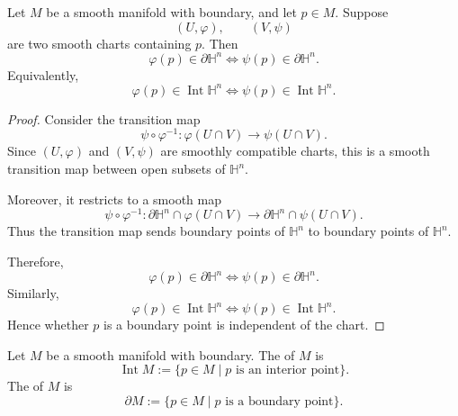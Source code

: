 \begin{center}
\end{center}


\begin{theorem}
Let $M$ be a smooth manifold with boundary, and let $p\in M$. Suppose
\[
  (U,\varphi),\qquad (V,\psi)
\]
are two smooth charts containing $p$. Then
\[
  \varphi(p)\in \partial\mathbb H^n
  \iff
  \psi(p)\in \partial\mathbb H^n.
\]
Equivalently,
\[
  \varphi(p)\in \operatorname{Int}\mathbb H^n
  \iff
  \psi(p)\in \operatorname{Int}\mathbb H^n.
\]
\end{theorem}

\begin{proof}
Consider the transition map
\[
  \psi\circ\varphi^{-1}:
  \varphi(U\cap V)\to \psi(U\cap V).
\]
Since $(U,\varphi)$ and $(V,\psi)$ are smoothly compatible charts, this is a smooth transition map between open subsets of $\mathbb H^n$.

Moreover, it restricts to a smooth map
\[
  \psi\circ\varphi^{-1}:
  \partial\mathbb H^n\cap \varphi(U\cap V)
  \to
  \partial\mathbb H^n\cap \psi(U\cap V).
\]
Thus the transition map sends boundary points of $\mathbb H^n$ to boundary points of $\mathbb H^n$.

Therefore,
\[
  \varphi(p)\in \partial\mathbb H^n
  \iff
  \psi(p)\in \partial\mathbb H^n.
\]
Similarly,
\[
  \varphi(p)\in \operatorname{Int}\mathbb H^n
  \iff
  \psi(p)\in \operatorname{Int}\mathbb H^n.
\]
Hence whether $p$ is a boundary point is independent of the chart.
\end{proof}

\begin{definition}
Let $M$ be a smooth manifold with boundary. The  of $M$ is
\[
  \operatorname{Int} M
  :=
  \{p\in M\mid p \text{ is an interior point}\}.
\]
The  of $M$ is
\[
  \partial M
  :=
  \{p\in M\mid p \text{ is a boundary point}\}.
\]
\end{definition}

